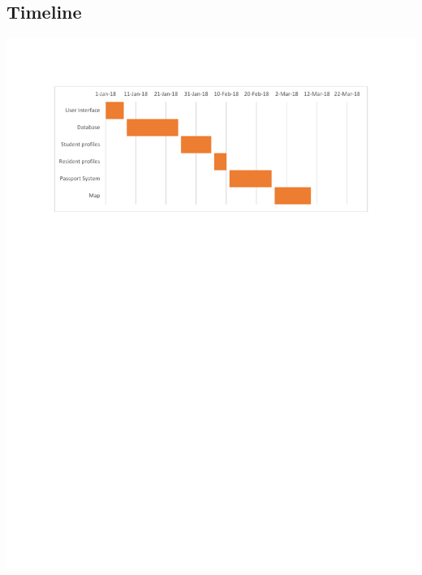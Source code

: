 \documentclass[draftclsnofoot, onecolumn, 10pt, compsoc]{IEEEtran}
\begin{document}
		\subsection{Timeline}
			\includegraphics[width=\textwidth]{GanttChart.pdf}
\end{document}
